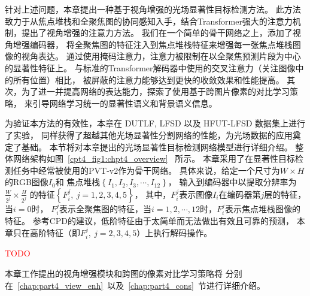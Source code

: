 % 
% 
% 
% 
\par
针对上述问题，本章提出一种基于视角增强的光场显著性目标检测方法。
此方法致力于从焦点堆栈和全聚焦图的协同感知入手，结合Transformer强大的注意力机制，提出了视角增强的注意力方法。
我们在一个简单的骨干网络之上，添加了视角增强编码器，
将全聚焦图的特征注入到焦点堆栈特征来增强每一张焦点堆栈图像的视角表达。
通过使用掩码注意力，注意力被限制在以全聚焦预测片段为中心的显著性特征上。
与标准的Transformer解码器中使用的交叉注意力（关注图像中的所有位置）相比，
被屏蔽的注意力能够达到更快的收敛效果和性能提高。
其次，为了进一并提高网络的表达能力，探索了使用基于跨图片像素的对比学习策略，
来引导网络学习统一的显著性语义和背景语义信息。
\par
% 
% 
% 
% 
为验证本方法的有效性，本章在 DUTLF, LFSD 以及 HFUT-LFSD 数据集上进行了实验，
同样获得了超越其他光场显著性分割网络的性能，为光场数据的应用奠定了基础。
% 
% 
% 
% 
% 
% 
% 
% 
% 
% 
本节将对本章提出的光场显著性目标检测网络模型进行详细介绍。
整体网络架构如图~\ref{cpt4_fig1:chpt4_overview}
~所示。
本章采用了在显著性目标检测任务中经常被使用的PVT-v2作为骨干网络。
具体来说，给定一个尺寸为$W \times H$的RGB图像$I_{0}$和
焦点堆栈$\left \{  I_{1},I_{2},I_{3},\cdots,I_{12} \right \} $，
输入到编码器中以提取分辨率为$\frac{W}{2^{j}} \times \frac{H}{2^{j}} $
的特征$\left \{ F_{i}^{j},~j=1,2,3,4,5 \right \}$，
其中，$F_{i}^{j}$表示图像$I_{i}$在编码器第$j$层的特征，当$i=0$时，
$F_{i}^{j}$表示全聚焦图的特征，当$i=1,2,\cdots,12$时，$F_{i}^{j}$表示焦点堆栈图像的特征。
参考CPD的建议，低阶特征由于太简单而无法做出有效且可靠的预测，
本章只在高阶特征（即$F_{i}^{j},~j=2,3,4,5$）上执行解码操作。

\textcolor{red}{TODO}

本章工作提出的视角增强模块和跨图的像素对比学习策略将
分别在~\ref{chap:part4_view_enh}~以及~\ref{chap:part4_cons}~节进行详细介绍。


